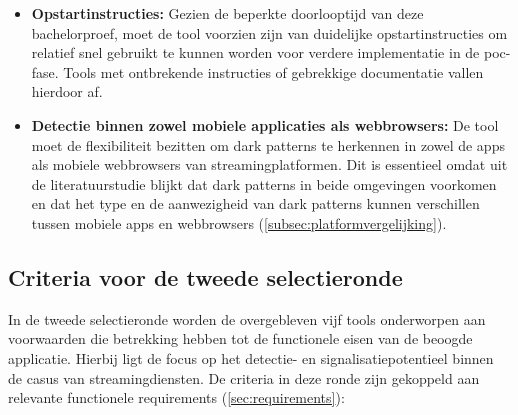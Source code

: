 \begin{itemize}
    \item \textbf{Opstartinstructies:} Gezien de beperkte doorlooptijd van deze bachelorproef, moet de tool voorzien zijn van duidelijke opstartinstructies om relatief snel gebruikt te kunnen worden voor verdere implementatie in de \acrshort{poc}-fase. Tools met ontbrekende instructies of gebrekkige documentatie vallen hierdoor af.
    
    \item \textbf{Detectie binnen zowel mobiele applicaties als webbrowsers:} De tool moet de flexibiliteit bezitten om dark patterns te herkennen in zowel de apps als mobiele webbrowsers van streamingplatformen. Dit is essentieel omdat uit de literatuurstudie blijkt dat dark patterns in beide omgevingen voorkomen en dat het type en de aanwezigheid van dark patterns kunnen verschillen tussen mobiele apps en webbrowsers (\ref{subsec:platformvergelijking}).
\end{itemize}

\subsection{Criteria voor de tweede selectieronde}
\label{subsec:criteria_ronde2}

\vspace{1em}

In de tweede selectieronde worden de overgebleven vijf tools onderworpen aan voorwaarden die betrekking hebben tot de functionele eisen van de beoogde applicatie. Hierbij ligt de focus op het detectie- en signalisatiepotentieel binnen de casus van streamingdiensten. De criteria in deze ronde zijn gekoppeld aan relevante functionele requirements (\ref{sec:requirements}):

